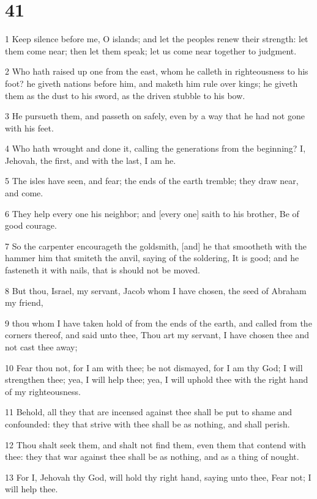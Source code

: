 \chapter{41}

\par 1 Keep silence before me, O islands; and let the peoples renew their strength: let them come near; then let them speak; let us come near together to judgment.
\par 2 Who hath raised up one from the east, whom he calleth in righteousness to his foot? he giveth nations before him, and maketh him rule over kings; he giveth them as the dust to his sword, as the driven stubble to his bow.
\par 3 He pursueth them, and passeth on safely, even by a way that he had not gone with his feet.
\par 4 Who hath wrought and done it, calling the generations from the beginning? I, Jehovah, the first, and with the last, I am he.
\par 5 The isles have seen, and fear; the ends of the earth tremble; they draw near, and come.
\par 6 They help every one his neighbor; and [every one] saith to his brother, Be of good courage.
\par 7 So the carpenter encourageth the goldsmith, [and] he that smootheth with the hammer him that smiteth the anvil, saying of the soldering, It is good; and he fasteneth it with nails, that is should not be moved.
\par 8 But thou, Israel, my servant, Jacob whom I have chosen, the seed of Abraham my friend,
\par 9 thou whom I have taken hold of from the ends of the earth, and called from the corners thereof, and said unto thee, Thou art my servant, I have chosen thee and not cast thee away;
\par 10 Fear thou not, for I am with thee; be not dismayed, for I am thy God; I will strengthen thee; yea, I will help thee; yea, I will uphold thee with the right hand of my righteousness.
\par 11 Behold, all they that are incensed against thee shall be put to shame and confounded: they that strive with thee shall be as nothing, and shall perish.
\par 12 Thou shalt seek them, and shalt not find them, even them that contend with thee: they that war against thee shall be as nothing, and as a thing of nought.
\par 13 For I, Jehovah thy God, will hold thy right hand, saying unto thee, Fear not; I will help thee.
